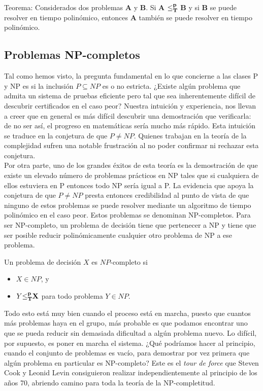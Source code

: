 \begin{fondo}
Teorema: Considerados dos problemas \textbf{A} y \textbf{B}. Si \textbf{A} $\bf{\leq} _{T}^p$ \textbf{B} y si \textbf{B} se puede resolver en tiempo polinómico, entonces \textbf{A} también se puede resolver en tiempo polinómico.
\end{fondo}

\subsection{Problemas NP-completos}

Tal como hemos visto, la pregunta fundamental en lo que concierne a las clases P y NP es si la inclusión $P \subseteq NP$ es o no estricta. ¿Existe algún problema que admita un sistema de pruebas eficiente pero tal que sea inherentemente difícil de descubrir certificados en el caso peor? Nuestra intuición y experiencia, nos llevan a creer que en general es más difícil descubrir una demostración que verificarla: de no ser así, el progreso en matemáticas sería mucho más rápido. Esta intuición se traduce en la conjetura de que $P \neq NP$. Quienes trabajan en la teoría de la complejidad sufren una notable frustración al no poder confirmar ni rechazar esta conjetura.\\

Por otra parte, uno de los grandes éxitos de esta teoría es la demostración de que existe un elevado número de problemas prácticos en NP tales que si cualquiera de ellos estuviera en P entonces todo NP sería igual a P. La evidencia que apoya la conjetura de que $P \neq NP$ presta entonces credibilidad al punto de vista de que ninguno de estos problemas se puede resolver mediante un algoritmo de tiempo polinómico en el caso peor. Estos problemas se denominan NP-completos. Para ser NP-completo, un problema de decisión tiene que pertenecer a NP y tiene que ser posible reducir polinómicamente cualquier otro problema de NP a ese problema.\\

\begin{fondo}
Un problema de decisión $X$ es $NP$-completo si
\begin{itemize}
\item $X \in NP$, y
\item $Y \bf{\leq} _{T}^p X$ para todo problema $Y \in NP$.
\end{itemize}
\end{fondo}

Todo esto está muy bien cuando el proceso está en marcha, puesto que cuantos más problemas haya en el grupo, más probable es que podamos encontrar uno que se pueda reducir sin demasiada dificultad a algún problema nuevo. Lo difícil, por supuesto, es poner en marcha el sistema. ¿Qué podríamos hacer al principio, cuando el conjunto de problemas es vacío, para demostrar por vez primera que algún problema en particular es NP-completo? Este es el \emph{tour de force} que Steven Cook y Leonid Levin consiguieron realizar independientemente al principio de los años 70, abriendo camino para toda la teoría de la NP-completitud.

